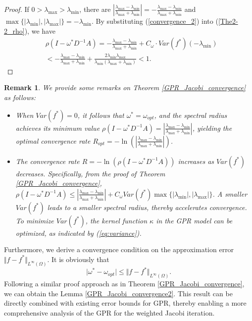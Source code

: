 \documentclass[preprint,review,sort&compress,3p]{elsarticle}
\newtheorem{rk}{Remark }[section]
\begin{document}
\begin{proof}
	If $0>\lambda_{\max}>\lambda_{\min}$, there are $\left\vert\frac{\lambda_{\max}-\lambda_{\min}}{\lambda_{\max}+\lambda_{\min}} \right\vert = -\frac{\lambda_{\max}-\lambda_{\min}}{\lambda_{\max}+\lambda_{\min}}$ and $\max\{\vert \lambda_{\min}\vert, \vert \lambda_{\max}\vert\} =-\lambda_{\min} $.  By substituting (\ref{convergence_2}) into (\ref{The2-2_rho}), we have
	\begin{align*}
		&\rho(I-\omega^* D^{-1} A)  = -\frac{\lambda_{\max}-\lambda_{\min}}{\lambda_{\max}+\lambda_{\min}}+C_\omega \cdot Var(f^*)(- \lambda_{\min})\\
		&<-\frac{\lambda_{\max}-\lambda_{\min}}{\lambda_{\max}+\lambda_{\min}}+\frac{2\lambda_{\min}\lambda_{\max}}{\lambda_{\min}(\lambda_{\max}+\lambda_{\min})}<1.
	\end{align*}
\end{proof}

\begin{rk}
	We provide some remarks on Theorem \ref{GPR_Jacobi_convergence} as follows:
	\begin{itemize}
		\item When \( Var(f^*) = 0 \), it follows that \( \omega^* = \omega_{opt} \), and the spectral radius achieves its minimum value \( \rho(I - \omega^* D^{-1} A) = \left| \frac{\lambda_{\max} - \lambda_{\min}}{\lambda_{\max} + \lambda_{\min}} \right| \), yielding the optimal convergence rate \( R_{opt} = -\ln\left( \left| \frac{\lambda_{\max} - \lambda_{\min}}{\lambda_{\max} + \lambda_{\min}} \right| \right) \).
		\item The convergence rate \( R = -\ln(\rho(I - \omega^* D^{-1} A)) \) increases as \( Var(f^*) \) decreases. Specifically, from the proof of Theorem \ref{GPR_Jacobi_convergence}, \( \rho(I - \omega^* D^{-1} A) \leq \left| \frac{\lambda_{\max} - \lambda_{\min}}{\lambda_{\max} + \lambda_{\min}} \right| + C_\omega Var(f^*) \max \{ |\lambda_{\min}|, |\lambda_{\max}| \} \). A smaller \( Var(f^*) \) leads to a smaller spectral radius, thereby accelerates convergence. To minimize \( Var(f^*) \),  the kernel function \( \kappa \) in the GPR model can be optimized, as indicated by (\ref{eq:variance}).
	\end{itemize}
\end{rk}



Furthermore, we derive a convergence condition on the approximation error $\Vert f-f^*\Vert_{L^\infty(\Omega)}$. It is obviously that 
\[\vert \omega^*-\omega_{opt}\vert \le  \Vert f-f^*\Vert_{L^\infty(\Omega)}. \]
Following a similar proof approach as in Theorem \ref{GPR_Jacobi_convergence}, we can obtain the Lemma \ref{GPR_Jacobi_convergence2}. This result can be directly combined with existing error bounds for GPR, thereby enabling a more comprehensive analysis of the GPR  for the weighted Jacobi iteration.
\end{document}
